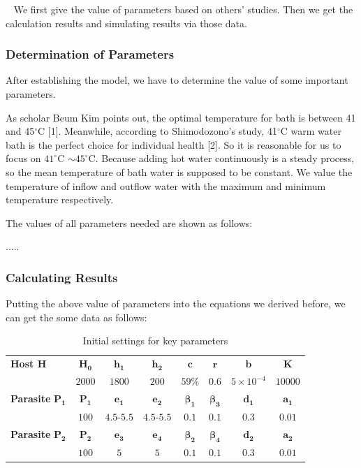 \documentclass{mcmthesis}
\begin{document}
\quad~ We first give the value of parameters based on others’ studies. Then we get the calculation results and simulating results via those data.

\subsubsection{Determination of Parameters}

After establishing the model, we have to determine the value of some
important parameters.

As scholar Beum Kim points out, the optimal temperature for bath is
between 41 and 45$^\circ$C [1]. Meanwhile, according to Shimodozono's study, 41$^\circ$C warm water bath is the perfect choice for individual health [2]. So it is reasonable for us to focus on $41^\circ$C $\sim 45^\circ$C. Because adding hot water continuously is a steady process, so the mean temperature of bath water is supposed to be constant. We value the temperature of inflow and outflow water with the maximum and minimum temperature respectively.

The values of all parameters needed are shown as follows:

.....

\subsubsection{Calculating Results}

Putting the above value of parameters into the equations we derived before, we can get the some data as follows:

\begin{table}[h]
	\centering
	\caption{Initial settings for key parameters}
	\label{tab2} 
	\begin{tabular}{lccccccc}
		\hline
		\textbf{Host H}&$\mathbf{H_0}$&$\mathbf{h_1}$&$\mathbf{h_2}$&$\mathbf{c}$&$\mathbf{r}$&$\mathbf{b}$&$\mathbf{K}$\\ 
		&$2000$&$1800$&$200$&$59\%$&$0.6$&$5\times 10^{-4}$&$10000$\\\hline
		\textbf{Parasite }$\mathbf{P_1}$&$\mathbf{P_1}$&$\mathbf{e_1}$&$\mathbf{e_2}$&$\mathbf{\beta_1}$&$\mathbf{\beta_3}$&$\mathbf{d_1}$&$\mathbf{a_1}$\\ 
		&$100$&$4.5$-$5.5$&$4.5$-$5.5$&$0.1$&$0.1$&$0.3$&$0.01$\\\hline
		\textbf{Parasite }$\mathbf{P_2}$&$\mathbf{P_2}$&$\mathbf{e_3}$&$\mathbf{e_4}$&$\mathbf{\beta_2}$&$\mathbf{\beta_4}$&$\mathbf{d_2}$&$\mathbf{a_2}$\\ 
		&$100$&$5$&$5$&$0.1$&$0.1$&$0.3$&$0.01$
		\\ \hline
	\end{tabular}
\end{table}
\end{document}
